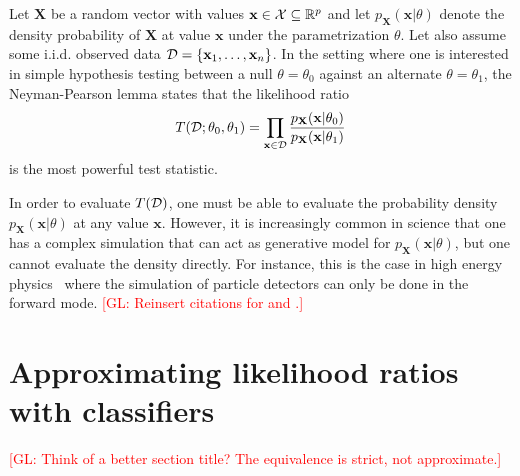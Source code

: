 \documentclass[12pt]{article}
\numberwithin{equation}{section}
\theoremstyle{plain}
\newcommand{\glnote}[1]{\textcolor{red}{[GL: #1]}}
\begin{document}
Let $\mathbf{X}$ be a random vector with values $\mathbf{x} \in {\cal X}
\subseteq \mathbb{R}^p$ and let $p_\mathbf{X}(\mathbf{x}|\theta)$ denote the
density probability of $\mathbf{X}$ at value $\mathbf{x}$ under the
parametrization $\theta$. Let also assume some i.i.d. observed data ${\cal D} = \{
\mathbf{x}_1, \dots, \mathbf{x}_n \}$. In the setting where one is interested in
simple hypothesis testing between a null $\theta=\theta_0$ against an alternate
$\theta=\theta_1$, the Neyman-Pearson lemma states that the likelihood ratio
\begin{equation}\label{eqn:likelihood-ratio-test}
T({\cal D}; \theta_0, \theta_1) = \prod_{\mathbf{x} \in {\cal D}} \frac{ p_\mathbf{X}(\mathbf{x}|\theta_0)}{ p_\mathbf{X}(\mathbf{x}|\theta_1)}
\end{equation}
is the most powerful test statistic.

In order to evaluate $T({\cal D})$, one must be able to evaluate the probability
density $p_\mathbf{X}(\mathbf{x}| \theta)$ at any value $\mathbf{x}$. However,
it is increasingly common in science that one has a complex simulation that can
act as generative model for $p_\mathbf{X}(\mathbf{x}|\theta)$, but one cannot
evaluate the density directly. For instance, this is the case in high energy
physics~\citep{Neal:2007zz} where the simulation of particle detectors can only
be done in the forward mode. \glnote{Reinsert citations for \cite{ClaytonScott}
and \cite{JMLR:v14:tong13a}.}




\section{Approximating likelihood ratios with classifiers}
\label{sec:approx}

\glnote{Think of a better section title? The equivalence is strict, not approximate.}
\end{document}

